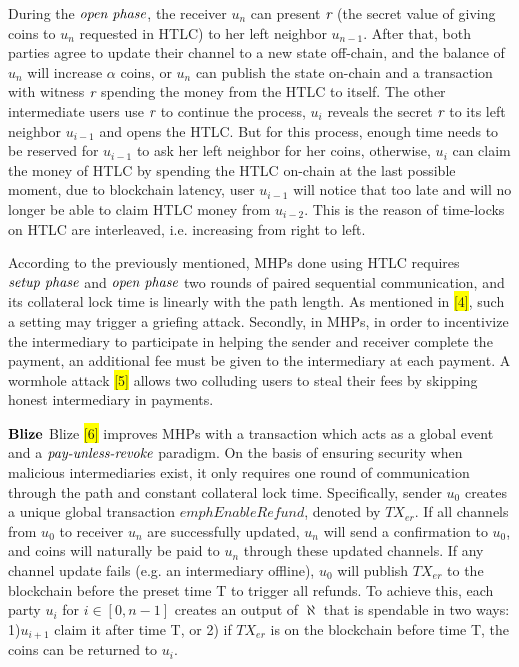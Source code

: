 \documentclass[conference]{IEEEtran}
\begin{document}
During the $\emph{open phase}$, the receiver $u_n$ can present $\emph{r}$ (the secret value of giving coins to $u_n$ requested in HTLC) 
to her left neighbor $u_{n-1}$. After that, both parties agree to update their channel to a new state off-chain, and the balance of 
$u_n$ will increase $\alpha$ coins, or $u_n$ can publish the state on-chain and a transaction with witness $\emph{r}$ spending the 
money from the HTLC to itself. The other intermediate users use $\emph{r}$ to continue the process, $u_i$ reveals the secret $\emph{r}$ 
to its left neighbor $u_{i-1}$ and opens the HTLC. But for this process, enough time needs to be reserved for $u_{i-1}$ to ask her left 
neighbor for her coins, otherwise, $u_i$ can claim the money of HTLC by spending the HTLC on-chain at the last possible moment, due to 
blockchain latency, user $u_{i-1}$ will notice that too late and will no longer be able to claim HTLC money from $u_{i-2}$. This is the 
reason of time-locks on HTLC are interleaved, i.e. increasing from right to left.

According to the previously mentioned, MHPs done using HTLC requires $\emph{setup phase}$ and $\emph{open phase}$ two rounds of paired 
sequential communication, and its collateral lock time is linearly with the path length. As mentioned in \colorbox{yellow}{[4]}, such 
a setting may trigger a griefing attack. Secondly, in MHPs, in order to incentivize the intermediary to participate in helping the sender 
and receiver complete the payment, an additional fee must be given to the intermediary at each payment. A wormhole attack \colorbox{yellow}{[5]} 
allows two colluding users to steal their fees by skipping honest intermediary in payments.

\noindent $\bf{Blize}$   Blize \colorbox{yellow}{[6]} improves MHPs with a transaction which acts as a global event and a 
$\emph{pay-unless-revoke}$ paradigm. On the basis of ensuring security when malicious intermediaries exist, it only requires 
one round of communication through the path and constant collateral lock time. Specifically, sender $u_0$ creates a unique global 
transaction $emph{Enable Refund}$, denoted by $TX_{er}$. If all channels from $u_0$ to receiver $u_n$ are successfully updated, $u_n$ 
will send a confirmation to $u_0$, and coins will naturally be paid to $u_n$ through these updated channels. If any channel update 
fails (e.g. an intermediary offline), $u_0$ will publish $TX_{er}$ to the blockchain before the preset time T to trigger all refunds. 
To achieve this, each party $u_i$ for $i \in [0,n-1]$ creates an output of $\aleph$ that is spendable in two ways: 1)$u_{i+1}$ claim it 
after time T, or 2) if $TX_{er}$ is on the blockchain before time T, the coins can be returned to $u_i$.
\end{document}
